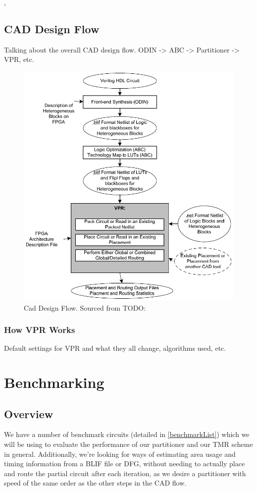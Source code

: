 \documentclass[12pt,drafta4paper,oneside]{memoir} %
\begin{document}
{\cite{FPGAReview},\cite{VTMR}

\section{CAD Design Flow}
Talking about the overall CAD design flow. ODIN -> ABC -> Partitioner -> VPR, etc.
\begin{figure}
    \includegraphics[width=\textwidth]{images/vpr-cad.png}
    \caption{Cad Design Flow. Sourced from TODO:}
    \label{CADFlow}
\end{figure}
\subsection{How VPR Works}
Default settings for VPR and what they all change, algorithms used, etc.

\chapter{Benchmarking}
\section{Overview}
We have a number of benchmark circuits (detailed in \ref{benchmarkList}) which we will be using to evaluate the performance of our partitioner and our \ac{TMR} scheme in general.
Additionally, we're looking for ways of estimating area usage and timing information from a \ac{BLIF} file or \ac{DFG}, without needing to actually place and route the partial circuit after each iteration, as we desire a partitioner with speed of the same order as the other steps in the \ac{CAD} flow.

}
\end{document}
